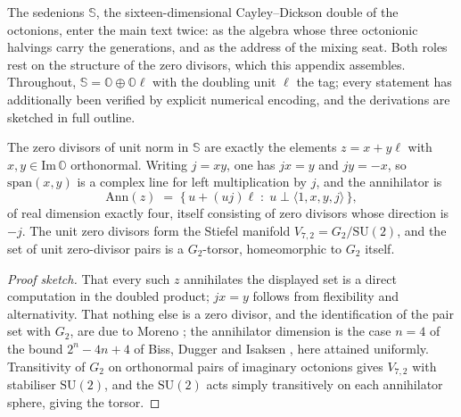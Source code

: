 The sedenions $\mathbb{S}$, the sixteen-dimensional Cayley--Dickson double of the octonions, enter
the main text twice: as the algebra whose three octonionic halvings carry the generations, and as
the address of the mixing seat. Both roles rest on the structure of the zero divisors, which this
appendix assembles. Throughout, $\mathbb{S} = \mathbb{O} \oplus \mathbb{O}\ell$ with the doubling
unit $\ell$ the tag; every statement has additionally been verified by explicit numerical encoding,
and the derivations are sketched in full outline.

\begin{proposition}\label{prop:zd-locus}
The zero divisors of unit norm in $\mathbb{S}$ are exactly the elements $z = x + y\ell$ with
$x, y \in \mathrm{Im}\,\mathbb{O}$ orthonormal. Writing $j = xy$, one has $jx = y$ and $jy = -x$,
so $\mathrm{span}(x,y)$ is a complex line for left multiplication by $j$, and the annihilator is
\[
  \mathrm{Ann}(z) \;=\; \{\, u + (uj)\ell \;:\; u \perp \langle 1, x, y, j \rangle \,\},
\]
of real dimension exactly four, itself consisting of zero divisors whose direction is $-j$. The
unit zero divisors form the Stiefel manifold $V_{7,2} = G_2/\mathrm{SU}(2)$, and the set of unit
zero-divisor pairs is a $G_2$-torsor, homeomorphic to $G_2$ itself.
\end{proposition}

\begin{proof}[Proof sketch]
That every such $z$ annihilates the displayed set is a direct computation in the doubled product;
$jx = y$ follows from flexibility and alternativity. That nothing else is a zero divisor, and the
identification of the pair set with $G_2$, are due to Moreno \autocite{moreno1998zerodivisors};
the annihilator dimension is the case $n = 4$ of the bound $2^n - 4n + 4$ of Biss, Dugger and
Isaksen \autocite{biss2008annihilators}, here attained uniformly. Transitivity of $G_2$ on
orthonormal pairs of imaginary octonions gives $V_{7,2}$ with stabiliser $\mathrm{SU}(2)$, and the
$\mathrm{SU}(2)$ acts simply transitively on each annihilator sphere, giving the torsor.
\end{proof}

